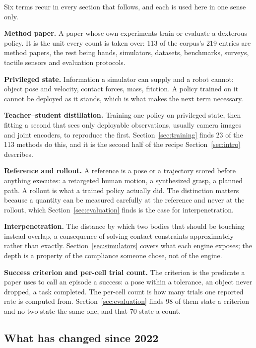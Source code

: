 Six terms recur in every section that follows, and each is used here in one sense only.

\textbf{Method paper.} A paper whose own experiments train or evaluate a dexterous policy. It is the unit
every count is taken over: 113 of the corpus's 219 entries are method papers, the rest being hands,
simulators, datasets, benchmarks, surveys, tactile sensors and evaluation protocols.

\textbf{Privileged state.} Information a simulator can supply and a robot cannot: object pose and
velocity, contact forces, mass, friction. A policy trained on it cannot be deployed as it stands,
which is what makes the next term necessary.

\textbf{Teacher--student distillation.} Training one policy on privileged state, then fitting a
second that sees only deployable observations, usually camera images and joint encoders, to
reproduce the first. Section~\ref{sec:training} finds 23 of the 113 methods do this, and it is the
second half of the recipe Section~\ref{sec:intro} describes.

\textbf{Reference and rollout.} A reference is a pose or a trajectory scored before anything
executes: a retargeted human motion, a synthesized grasp, a planned path. A rollout is what a
trained policy actually did. The distinction matters because a quantity can be measured carefully
at the reference and never at the rollout, which Section~\ref{sec:evaluation} finds is the case
for interpenetration.

\textbf{Interpenetration.} The distance by which two bodies that should be touching instead
overlap, a consequence of solving contact constraints approximately rather than exactly.
Section~\ref{sec:simulators} covers what each engine exposes; the depth is a property of the
compliance someone chose, not of the engine.

\textbf{Success criterion and per-cell trial count.} The criterion is the predicate a paper
uses to call an episode a success: a pose within a tolerance, an object never dropped, a task
completed. The per-cell count is how many trials one reported rate is computed from.
Section~\ref{sec:evaluation} finds 98 of them state a criterion and no two state the same one,
and that 70 state a count.

\subsection{What has changed since 2022}
\label{subsec:trends}

